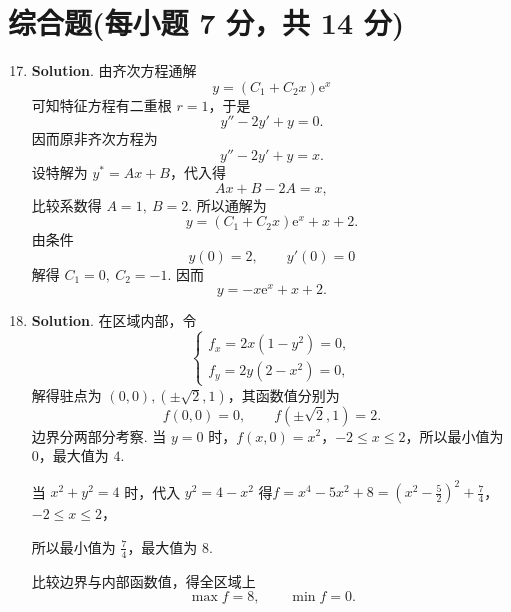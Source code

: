 \documentclass[../main.tex]{subfiles}
\begin{document}
\section{综合题(每小题 7 分，共 14 分)}
\begin{enumerate}
    \setcounter{enumi}{16}
    \item \textbf{Solution}. 由齐次方程通解
          \[
              y=(C_1+C_2x)\mathrm{e}^x
          \]
          可知特征方程有二重根 \(r=1\)，于是
          \[
              y''-2y'+y=0.
          \]
          因而原非齐次方程为
          \[
              y''-2y'+y=x.
          \]
          设特解为 \(y^*=Ax+B\)，代入得
          \[
              Ax+B-2A=x,
          \]
          比较系数得 \(A=1,\ B=2\). 所以通解为
          \[
              y=(C_1+C_2x)\mathrm{e}^x+x+2.
          \]
          由条件
          \[
              y(0)=2,\qquad y'(0)=0
          \]
          解得 \(C_1=0,\ C_2=-1\). 因而
          \[
              y=-x\mathrm{e}^x+x+2.
          \]

    \item \textbf{Solution}. 在区域内部，令
          \[
              \begin{cases}
                  f_x=2x(1-y^2)=0, \\
                  f_y=2y(2-x^2)=0,
              \end{cases}
          \]
          解得驻点为 \((0,0),(\pm\sqrt2,1)\)，其函数值分别为
          \[
              f(0,0)=0,\qquad f(\pm\sqrt2,1)=2.
          \]
          边界分两部分考察. 当 \(y=0\) 时，$f(x,0)=x^2$，$-2\le x\le 2$，所以最小值为 \(0\)，最大值为 \(4\).

          当 \(x^2+y^2=4 \) 时，代入 \(y^2=4-x^2\) 得$f=x^4-5x^2+8=\left(x^2-\frac{5}{2}\right)^2+\frac{7}{4}$，$-2\le x\le 2$，

          所以最小值为 \(\frac{7}{4}\)，最大值为 \(8\).

          比较边界与内部函数值，得全区域上
          \[
              \max f=8,\qquad \min f=0.
          \]

\end{enumerate}
\end{document}
